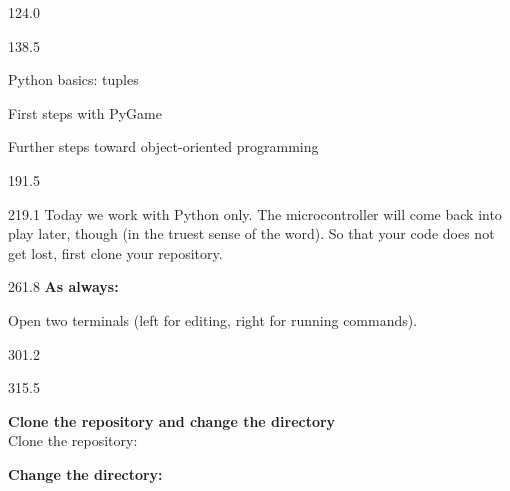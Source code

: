 \documentclass{aslab}
\begin{document}
\maketitleblock

\begin{region}{124.0}
\end{region}

\begin{region}[pitch=13]{138.5}
{\bfseries\color{aslabblue}
\begin{dashlist}
\item Python basics: tuples
\item First steps with PyGame
\item Further steps toward object-oriented programming
\end{dashlist}\par}
\end{region}

\begin{region}{191.5}
\end{region}

\begin{region}[pitch=14.1]{219.1}
Today we work with Python only. The microcontroller will come back into play
later, though (in the truest sense of the word). So that your code does not
get lost, first clone your repository.
\end{region}

\begin{region}[pitch=12.8]{261.8}
\textbf{As always:}
\begin{dashlist}
\item Open two terminals (left for editing, right for running commands).
\end{dashlist}
\end{region}

\begin{region}{301.2}
\end{region}

\begin{region}[pitch=13.55]{315.5}
\begin{letters}
\item \textbf{Clone the repository and change the directory}\\
  Clone the repository:\\
\item \textbf{Change the directory:}\\
\end{letters}
\end{region}
\end{document}
